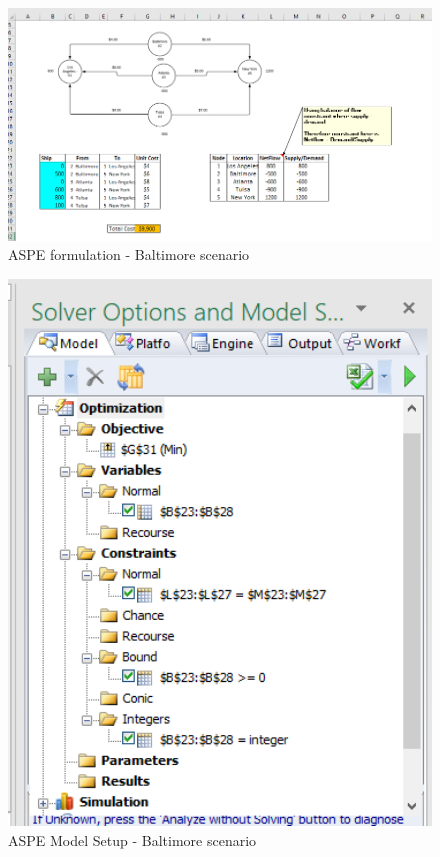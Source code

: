 \documentclass[]{article}
\begin{document}
\begin{figure}[h]

{\centering \includegraphics[width=12.03in]{Figures/Homework3/p1a} 

}

\caption{ASPE formulation - Baltimore scenario}\label{fig:unnamed-chunk-2}
\end{figure}

\begin{figure}[h]

{\centering \includegraphics[width=5.11in]{Figures/Homework3/modelp1a} 

}

\caption{ASPE Model Setup - Baltimore scenario}\label{fig:unnamed-chunk-3}
\end{figure}
\end{document}
